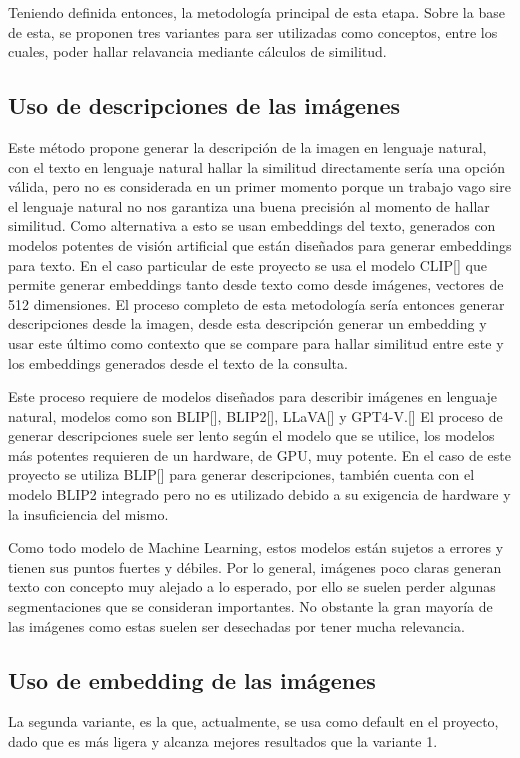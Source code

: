 Teniendo definida entonces, la metodolog\'ia principal de esta etapa. Sobre la base de esta, se proponen tres variantes para ser utilizadas como conceptos, entre los cuales, poder hallar relavancia mediante cálculos de similitud.

\subsection{Uso de descripciones de las imágenes}
Este método propone generar la descripción de la imagen en lenguaje natural, con el texto en lenguaje natural hallar la similitud directamente sería una opción válida, pero no es considerada en un primer momento porque un trabajo vago sire el lenguaje natural no nos garantiza una buena precisión al momento de hallar similitud. Como alternativa a esto se usan embeddings del texto, generados con modelos potentes de visión artificial que están diseñados para generar embeddings para texto. En el caso particular de este proyecto se usa el modelo CLIP[\cite{clip}]  que permite generar embeddings tanto desde texto como desde imágenes, vectores de 512 dimensiones. El proceso completo de esta metodología sería entonces generar descripciones desde la imagen, desde esta descripción generar un embedding y usar este último como contexto que se compare para hallar similitud entre este y los embeddings generados desde el texto de la consulta.

Este proceso requiere de modelos diseñados para describir imágenes en lenguaje natural, modelos como son BLIP[\cite{blip}], BLIP2[\cite{blip-2}], LLaVA[\cite{llava}] y GPT4-V.[\cite{gpt-4v}] El proceso de generar descripciones suele ser lento según el modelo que se utilice, los modelos más potentes requieren de un hardware, de GPU, muy potente. En el caso de este proyecto se utiliza BLIP[\cite{blip}] para generar descripciones, también cuenta con el modelo BLIP2 integrado pero no es utilizado debido a su exigencia de hardware y la insuficiencia del mismo.

Como todo modelo de Machine Learning, estos modelos están sujetos a errores y tienen sus puntos fuertes y débiles. Por lo general, imágenes poco claras generan texto con concepto muy alejado a lo esperado, por ello se suelen perder algunas segmentaciones que se consideran importantes. No obstante la gran mayoría de las imágenes como estas suelen ser desechadas por tener mucha relevancia.

\subsection{Uso de embedding de las imágenes}
La segunda variante, es la que, actualmente, se usa como default en el proyecto, dado que es más ligera y alcanza mejores resultados que la variante 1.

